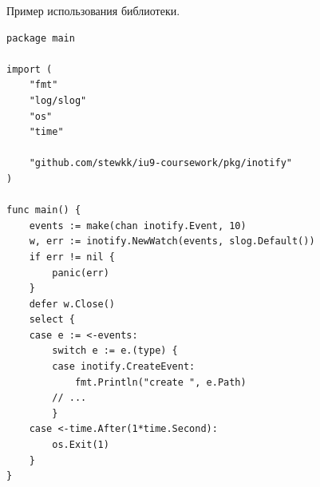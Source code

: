 \documentclass[14pt, russian]{scrartcl}
\begin{document}
\begin{listing}[H]
\caption{Пример использования библиотеки.}
\label{lst:logger_code}
\begin{verbatim}
package main

import (
	"fmt"
	"log/slog"
	"os"
	"time"

	"github.com/stewkk/iu9-coursework/pkg/inotify"
)

func main() {
	events := make(chan inotify.Event, 10)
	w, err := inotify.NewWatch(events, slog.Default())
	if err != nil {
		panic(err)
	}
	defer w.Close()
	select {
	case e := <-events:
		switch e := e.(type) {
		case inotify.CreateEvent:
			fmt.Println("create ", e.Path)
	    // ...
		}
	case <-time.After(1*time.Second):
		os.Exit(1)
	}
}
\end{verbatim}
\end{listing}
\end{document}
